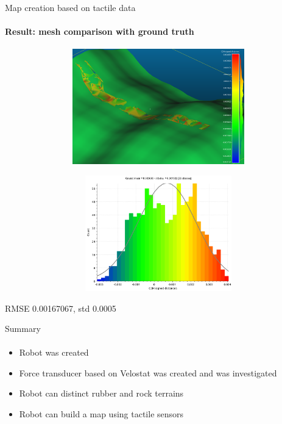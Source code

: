 \documentclass[aspectratio=169]{beamer}
\newcommand{\fbckg}[1]{\usebackgroundtemplate{\texttt{[image: \#1]}}}%
\begin{document}
\begin{frame}[t]{Map creation based on tactile data}
    \framesubtitle{Result: mesh comparison with ground truth}
    \vspace{-15pt}
    \begin{figure}[H]
        \begin{subfigure}{0.49\textwidth}
            \centering\includegraphics[height=5cm,width=1\textwidth,keepaspectratio]{mesh_comp.png}
        \end{subfigure}
        \begin{subfigure}{0.49\textwidth}
            \centering\includegraphics[height=5cm,width=1\textwidth,keepaspectratio]{mesh_hist.png}
        \end{subfigure}
    \end{figure}
    \alert{\Large RMSE 0.00167067, std 0.0005}
\end{frame}

\begin{frame}[t]{Summary}
\framesubtitle{}
    \Large
    \begin{itemize}
        \item Robot was created
        \item Force transducer based on Velostat was created and was investigated
        \item Robot can distinct rubber and rock terrains
        \item Robot can build a map using tactile sensors
    \end{itemize}
\end{frame}

\fbckg{fibeamer/figs/last_page.png}
\frame[plain]{}
\fbckg{fibeamer/figs/common.png}
\end{document}
